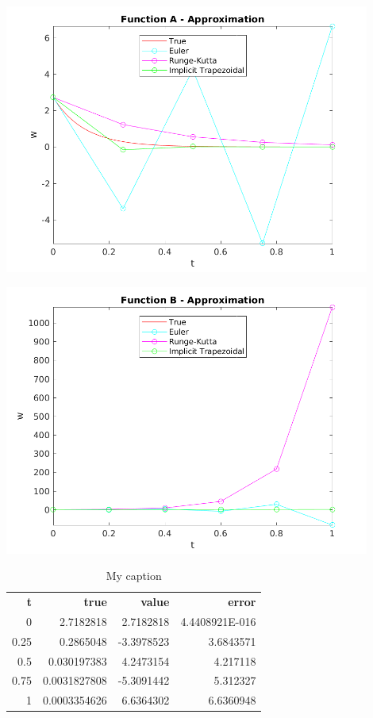 \documentclass{article}
\begin{document}
\begin{center}
  \includegraphics[width=0.9\textwidth]{../additional/unstable/a_compare_val.png}
  \label{fig:a_compare_val}
\end{center}

\begin{center}
  \includegraphics[width=0.9\textwidth]{../additional/unstable/b_compare_val.png}
  \label{fig:a_compare_err}
\end{center}


\begin{table}[]
\centering
\caption{My caption}
\label{my-label}
\begin{tabular}{rrrr}
\textbf{t} & \textbf{true} & \textbf{value} & \textbf{error} \\
0          & 2.7182818     & 2.7182818      & 4.4408921E-016 \\
0.25       & 0.2865048     & -3.3978523     & 3.6843571      \\
0.5        & 0.030197383   & 4.2473154      & 4.217118       \\
0.75       & 0.0031827808  & -5.3091442     & 5.312327       \\
1          & 0.0003354626  & 6.6364302      & 6.6360948         
\end{tabular}
\end{table}
\end{document}
